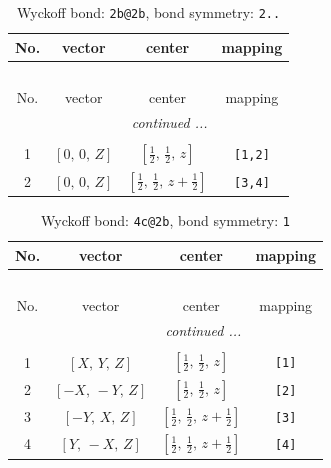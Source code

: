 \documentclass[fleqn,8pt]{jsarticle}
\begin{document}
\renewcommand{\arraystretch}{1.2}
\begin{longtable}{cccc}
\caption{Wyckoff bond: {\tt 2b@2b}, bond symmetry: {\tt 2..}}
 \\
 \hline \hline
No. & vector & center & mapping \\ \hline \endfirsthead

\multicolumn{3}{l}{\tablename\ \thetable{}} \\
 \hline \hline
No. & vector & center & mapping \\ \hline \endhead

 \hline \hline
\multicolumn{3}{r}{\footnotesize\it continued ...} \\ \endfoot

 \hline \hline
\multicolumn{3}{r}{} \\ \endlastfoot

1 & $\left[ 0,\, 0,\, Z \right]$ & $\left[ \frac{1}{2},\, \frac{1}{2},\, z \right]$ & {\tt [1,2]} \\ \hline
2 & $\left[ 0,\, 0,\, Z \right]$ & $\left[ \frac{1}{2},\, \frac{1}{2},\, z + \frac{1}{2} \right]$ & {\tt [3,4]} \\
\end{longtable}
\renewcommand{\arraystretch}{1.2}
\begin{longtable}{cccc}
\caption{Wyckoff bond: {\tt 4c@2b}, bond symmetry: {\tt 1}}
 \\
 \hline \hline
No. & vector & center & mapping \\ \hline \endfirsthead

\multicolumn{3}{l}{\tablename\ \thetable{}} \\
 \hline \hline
No. & vector & center & mapping \\ \hline \endhead

 \hline \hline
\multicolumn{3}{r}{\footnotesize\it continued ...} \\ \endfoot

 \hline \hline
\multicolumn{3}{r}{} \\ \endlastfoot

1 & $\left[ X,\, Y,\, Z \right]$ & $\left[ \frac{1}{2},\, \frac{1}{2},\, z \right]$ & {\tt [1]} \\ \hline
2 & $\left[ - X,\, - Y,\, Z \right]$ & $\left[ \frac{1}{2},\, \frac{1}{2},\, z \right]$ & {\tt [2]} \\ \hline
3 & $\left[ - Y,\, X,\, Z \right]$ & $\left[ \frac{1}{2},\, \frac{1}{2},\, z + \frac{1}{2} \right]$ & {\tt [3]} \\ \hline
4 & $\left[ Y,\, - X,\, Z \right]$ & $\left[ \frac{1}{2},\, \frac{1}{2},\, z + \frac{1}{2} \right]$ & {\tt [4]} \\
\end{longtable}
\end{document}
